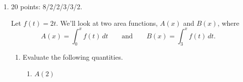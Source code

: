 \documentclass{article}
\begin{document}
\begin{enumerate}
\begin{enumerate}
\begin{enumerate}
    \item
      \begin{problem}[\stretch{0.5}]
        Which expression gives the total distance the raccoon travels from
        time $a$ to time $b$?
      \end{problem}

      \begin{solution} 
        The rate of change of distance is \emph{speed}, which is $|f(t)|$.
        Therefore, $\boxed{ \int_a^b |f(t)| \, dt} = {}$ (distance
        traveled by time $b$) - (distance traveled by time $a$), which is
        exactly the distance the raccoon travels between time $a$ and time
        $b$.
      \end{solution}

    \item
      \begin{problem}[\nstretch{0.5}]
        The raccoon's average speed between time $a$ and time $b$ is the
        total distance it traveled divided by the time elapsed.  Write a
        mathematical expression giving the raccoon's average speed between
        time $a$ and time $b$.
      \end{problem}

      \begin{solution}
        We've already seen that the distance the raccoon travels between
        times $a$ and $b$ is $\displaystyle \int_a^b |f(t)|\,dt$, so
        \[ \text{(average speed between times $a$ and $b$)} =
        \frac{\text{distance traveled}}{\text{time elapsed}} =
        \boxed{\frac{\displaystyle \int_{a}^{b} |f(t) |\,dt }{b-a}}.\] 
      \end{solution}

    \end{enumerate}
  \end{enumerate}

\item 

\begin{grading}
20 points: 8/2/2/3/3/2.
\end{grading}

Let $f(t)=2t$. We'll look at two area functions, $A(x)$ and $B(x)$, where
  $$
  A(x) = \int^x_0 f(t)\,dt\qquad \text{and} \qquad B(x) = \int^x_3
  f(t)\,dt.
  $$
  \begin{enumerate}

  \item
Evaluate the following quantities.

    \begin{enumerate}
      \item
        \begin{problem}[\vfill]
          $A(2)$
        \end{problem}


\end{enumerate}
\end{enumerate}
\end{enumerate}
\end{document}
